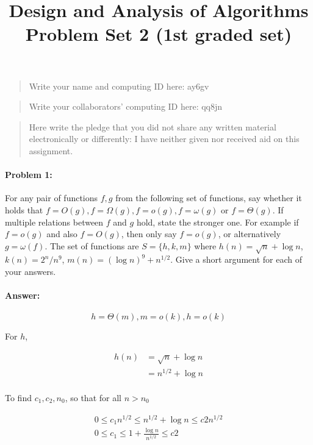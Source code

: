 \documentclass{article}
\title{Design and Analysis of Algorithms\\ {\bf Problem Set 2 (1st graded set)}}
\author{}
\begin{document}
\maketitle

\begin{quote}
    Write your name and computing ID here: ay6gv
\end{quote}

\vspace{20px}

\begin{quote}
    Write your collaborators' computing ID here: qq8jn
\end{quote}

\vspace{20px}

\begin{quote}
    Here write the pledge that you did not share any written material electronically or differently: I have neither given nor received aid on this assignment.
\end{quote}

\newpage
\paragraph{Problem 1:} For any pair of functions $f,g$ from the following set of functions, say whether it holds that $f=O(g), f=\Omega(g), f=o(g), f=\omega(g) $ or $f=\Theta(g)$. If multiple relations between $f$ and $g$ hold, state the stronger one. For example if $f=o(g)$ and also $f=O(g)$, then only say $f=o(g)$, or alternatively $g=\omega(f)$.  The set of functions are $S= \{h,k,m\}$ where $h(n)=\sqrt{n}+\log n$, $k(n) = 2^n/n^9$, $m(n) = (\log n)^9 + n^{1/2}$. Give a short argument for each of your answers.


\paragraph{Answer:}

$$h = \Theta(m), m = o(k), h = o(k)$$

For $h$,

$$\begin{aligned}
h(n)&=\sqrt{n}+\log n\\
&=n^{1/2}+\log n\\
\end{aligned}$$

To find $c_1, c_2, n_0$, so that for all $n>n_0$

$$\begin{aligned}
0 \le c_1n^{1/2} \le n^{1/2}+\log n \le c2n^{1/2}\\
0 \le c_1 \le 1+\frac{\log n}{n^{1/2}} \le c2
\end{aligned}$$
\end{document}
